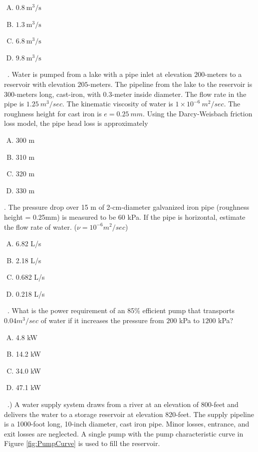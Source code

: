 \documentclass[12 pt]{article}
\begin{document}
\begin{enumerate} [(A)]
\item $0.8~\text{m}^3/\text{s}$
\item $1.3~\text{m}^3/\text{s}$
\item $6.8~\text{m}^3/\text{s}$
\item $9.8~\text{m}^3/\text{s}$
\end{enumerate}
~. Water is pumped from a lake with a pipe inlet at elevation $200$-meters to a reservoir with elevation $205$-meters.  The pipeline from the lake to the reservoir is $300$-meters long, cast-iron, with $0.3$-meter inside diameter.  The flow rate in the pipe is $1.25~m^3/sec$.  The kinematic viscosity of water is $1 \times 10^{-6}~ m^2/sec$.  The roughness height for cast iron is $e=0.25~mm$.  Using the Darcy-Weisbach friction loss model, the pipe head loss is approximately
\begin{enumerate} [(A)]
\item 300 m
\item 310 m
\item 320 m
\item 330 m
\end{enumerate}
.	The pressure drop over 15 m of 2-cm-diameter galvanized iron pipe (roughness height  = 0.25mm) is measured to be 60 kPa.  If the pipe is horizontal, estimate the flow rate of water.  ($\nu = 10^{-6} m^2/sec$)
\begin{enumerate} [(A)]
\item	6.82 L/s
\item 2.18 L/s
\item 0.682 L/s
\item	0.218 L/s
\end{enumerate}
~.	What is the power requirement of an 85\% efficient pump that transports $0.04 m^3/sec$ of water if it increases the pressure from $200$ kPa to $1200$ kPa?
\begin{enumerate} [(A)]
\item	4.8 kW
\item	14.2 kW
\item	34.0 kW
\item	47.1 kW
\end{enumerate}
~.) A water supply system draws from a river at an elevation of 800-feet and delivers the water to a storage reservoir at elevation 820-feet.  The supply pipeline is a 1000-foot long, 10-inch diameter, cast iron pipe.  Minor losses, entrance, and exit losses are neglected.  A single pump with the pump characteristic curve in Figure \ref{fig:PumpCurve} is used to fill the reservoir.
\end{document}
